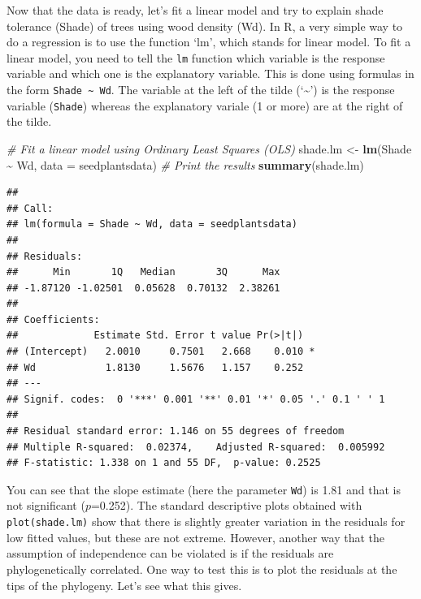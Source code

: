 \documentclass[
]{book}
\newenvironment{Shaded}{\begin{snugshade}}{\end{snugshade}}
\newcommand{\AttributeTok}[1]{\textcolor[rgb]{0.13,0.29,0.53}{#1}}
\newcommand{\CommentTok}[1]{\textcolor[rgb]{0.56,0.35,0.01}{\textit{#1}}}
\newcommand{\FunctionTok}[1]{\textcolor[rgb]{0.13,0.29,0.53}{\textbf{#1}}}
\newcommand{\NormalTok}[1]{#1}
\newcommand{\OtherTok}[1]{\textcolor[rgb]{0.56,0.35,0.01}{#1}}
\newcommand{\SpecialCharTok}[1]{\textcolor[rgb]{0.81,0.36,0.00}{\textbf{#1}}}
\begin{document}
Now that the data is ready, let's fit a linear model and try to explain shade tolerance (Shade) of trees using wood density (Wd). In R, a very simple way to do a regression is to use the function `lm', which stands for linear model. To fit a linear model, you need to tell the \texttt{lm} function which variable is the response variable and which one is the explanatory variable. This is done using formulas in the form \texttt{Shade\ \textasciitilde{}\ Wd}. The variable at the left of the tilde (`\textasciitilde{}') is the response variable (\texttt{Shade}) whereas the explanatory variale (1 or more) are at the right of the tilde.

\begin{Shaded}
\begin{Highlighting}[]
\CommentTok{\# Fit a linear model using Ordinary Least Squares (OLS)}
\NormalTok{shade.lm }\OtherTok{\textless{}{-}} \FunctionTok{lm}\NormalTok{(Shade }\SpecialCharTok{\textasciitilde{}}\NormalTok{ Wd, }\AttributeTok{data =}\NormalTok{ seedplantsdata)}
\CommentTok{\# Print the results}
\FunctionTok{summary}\NormalTok{(shade.lm)}
\end{Highlighting}
\end{Shaded}

\begin{verbatim}
## 
## Call:
## lm(formula = Shade ~ Wd, data = seedplantsdata)
## 
## Residuals:
##      Min       1Q   Median       3Q      Max 
## -1.87120 -1.02501  0.05628  0.70132  2.38261 
## 
## Coefficients:
##             Estimate Std. Error t value Pr(>|t|)  
## (Intercept)   2.0010     0.7501   2.668    0.010 *
## Wd            1.8130     1.5676   1.157    0.252  
## ---
## Signif. codes:  0 '***' 0.001 '**' 0.01 '*' 0.05 '.' 0.1 ' ' 1
## 
## Residual standard error: 1.146 on 55 degrees of freedom
## Multiple R-squared:  0.02374,    Adjusted R-squared:  0.005992 
## F-statistic: 1.338 on 1 and 55 DF,  p-value: 0.2525
\end{verbatim}

You can see that the slope estimate (here the parameter \texttt{Wd}) is 1.81 and that is not significant (\(p\)=0.252). The standard descriptive plots obtained with \texttt{plot(shade.lm)} show that there is slightly greater variation in the residuals for low fitted values, but these are not extreme. However, another way that the assumption of independence can be violated is if the residuals are phylogenetically correlated. One way to test this is to plot the residuals at the tips of the phylogeny. Let's see what this gives.
\end{document}
